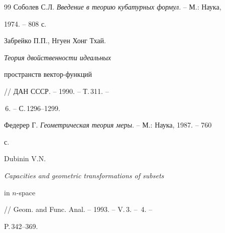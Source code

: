 \begin{thebibliography}{99}
Соболев С.Л. {\em Введение в теорию кубатурных формул}. -- М.: Наука, 


1974. -- 808 с. 




Забрейко П.П., Нгуен Хонг Тхай. {\em Теория двойственности идеальных 


пространств вектор-функций} // ДАН СССР. -- 1990. -- Т.\,311. -- 


\No\,6. -- С.\,1296--1299. 




Федерер Г. {\em Геометрическая теория меры}. -- М.: Наука, 1987. -- 760 


с. 




Dubinin V.N. {\em Capacities and geometric transformations of subsets 


in $n$-space} // Geom. and Func. Anal. -- 1993. -- V.\,3. -- \No\,4. -- 


P.\,342--369. 


 


 


\end{thebibliography} 


 


\vskip 2cm 


 






 


\label{end} 


 








